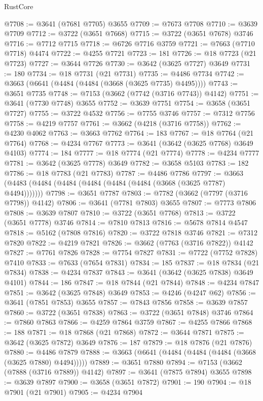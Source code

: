 \begin{lexlean}{RustCore}
\begin{coremodule}
@7708 := @3641 (@7681 @7705) @3655
@7709 := @7673 @7708
@7710 := @3639 @7709
@7712 := @3722 (@3651 @7668)
@7715 := @3722 (@3651 @7678) @3746
@7716 := @7712 @7715
@7718 := @6726 @7716 @3759
@7721 := @7663 (@7710 @7718) @4474
@7722 := @4255 @7721
@7723 := 181
@7726 := @18 @7723 (@21 @7723)
@7727 := @3644 @7726
@7730 := @3642 (@3625 @7727) @3649
@7731 := 180
@7734 := @18 @7731 (@21 @7731)
@7735 := @4486 @7734
@7742 := @3663 (@6641 (@4484 (@4484 (@3668 (@3625 @7735) @4495))))
@7743 := @3651 @7735
@7748 := @7153 (@3662 (@7742 (@3716 @7743)) @4142)
@7751 := @3641 (@7730 @7748) @3655
@7752 := @3639 @7751
@7754 := @3658 (@3651 @7727)
@7755 := @3722 @4532
@7756 := @7755 @3746
@7757 := @7312 @7756
@7758 := @4219 @7757
@7761 := @3662 (@4218 (@3716 @7758))
@7762 := @4230 @4062
@7763 := @3663 @7762
@7764 := 183
@7767 := @18 @7764 (@21 @7764)
@7768 := @4234 @7767
@7773 := @3641 (@3642 (@3625 @7768) @3649 @4103)
@7774 := 184
@7777 := @18 @7774 (@21 @7774)
@7778 := @4234 @7777
@7781 := @3642 (@3625 @7778) @3649
@7782 := @3658 @5103
@7783 := 182
@7786 := @18 @7783 (@21 @7783)
@7787 := @4486 @7786
@7797 := @3663 (@4483 (@4484 (@4484 (@4484 (@4484 (@4484 (@3668 (@3625 @7787) @4494)))))))
@7798 := @3651 @7787
@7803 := @7782 (@3662 (@7797 (@3716 @7798)) @4142)
@7806 := @3641 (@7781 @7803) @3655
@7807 := @7773 @7806
@7808 := @3639 @7807
@7810 := @3722 (@3651 @7768)
@7813 := @3722 (@3651 @7778) @3746
@7814 := @7810 @7813
@7816 := @5678 @7814 @4547
@7818 := @5162 (@7808 @7816)
@7820 := @3722 @7818 @3746
@7821 := @7312 @7820
@7822 := @4219 @7821
@7826 := @3662 (@7763 (@3716 @7822)) @4142
@7827 := @7761 @7826
@7828 := @7754 @7827
@7831 := @7722 (@7752 @7828) @7410
@7833 := @7633 (@7654 @7831)
@7834 := 185
@7837 := @18 @7834 (@21 @7834)
@7838 := @4234 @7837
@7843 := @3641 (@3642 (@3625 @7838) @3649 @4101)
@7844 := 186
@7847 := @18 @7844 (@21 @7844)
@7848 := @4234 @7847
@7851 := @3642 (@3625 @7848) @3649
@7853 := @4246 (@4247 @62)
@7856 := @3641 (@7851 @7853) @3655
@7857 := @7843 @7856
@7858 := @3639 @7857
@7860 := @3722 (@3651 @7838)
@7863 := @3722 (@3651 @7848) @3746
@7864 := @7860 @7863
@7866 := @4259 @7864 @3759
@7867 := @4255 @7866
@7868 := 188
@7871 := @18 @7868 (@21 @7868)
@7872 := @3644 @7871
@7875 := @3642 (@3625 @7872) @3649
@7876 := 187
@7879 := @18 @7876 (@21 @7876)
@7880 := @4486 @7879
@7888 := @3663 (@6641 (@4484 (@4484 (@4484 (@3668 (@3625 @7880) @4494)))))
@7889 := @3651 @7880
@7894 := @7153 (@3662 (@7888 (@3716 @7889)) @4142)
@7897 := @3641 (@7875 @7894) @3655
@7898 := @3639 @7897
@7900 := @3658 (@3651 @7872)
@7901 := 190
@7904 := @18 @7901 (@21 @7901)
@7905 := @4234 @7904

\end{coremodule}
\end{lexlean}
